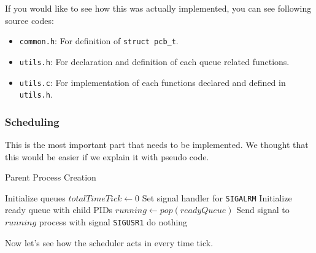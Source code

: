 \documentclass{homework}
\begin{document}
If you would like to see how this was actually implemented, you can see following source codes:
\begin{itemize}
    \item \texttt{common.h}: For definition of \texttt{struct pcb_t}.
    \item \texttt{utils.h}: For declaration and definition of each queue related functions.
    \item \texttt{utils.c}: For implementation of each functions declared and defined in \texttt{utils.h}.
\end{itemize}
\subsubsection{Scheduling}
This is the most important part that needs to be implemented. We thought that this would be easier if we explain it with pseudo code. 

\begin{algorithm}
\caption{Parent Process Creation}\label{alg:cap}
\begin{algorithmic}
\State Initialize queues
\State $totalTimeTick \gets 0$
\State Set signal handler for \texttt{SIGALRM} 
\State Initialize ready queue with child PIDs
\State $running \gets pop(readyQueue)$ 
\State Send signal to $running$ process with signal \texttt{SIGUSR1}
    \State do nothing
\EndWhile
\end{algorithmic}
\end{algorithm}
\pagebreak
Now let's see how the scheduler acts in every time tick.
\end{document}
